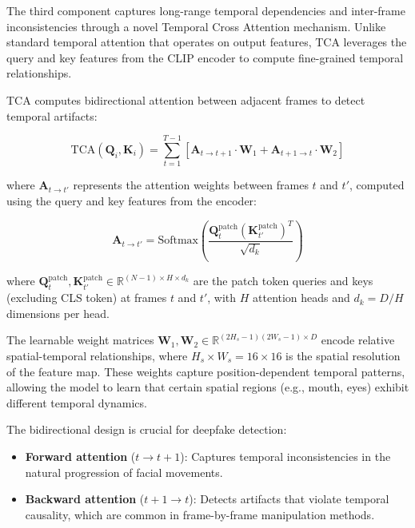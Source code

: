The third component captures long-range temporal dependencies and inter-frame inconsistencies through a novel Temporal Cross Attention mechanism. Unlike standard temporal attention that operates on output features, TCA leverages the query and key features from the CLIP encoder to compute fine-grained temporal relationships.

TCA computes bidirectional attention between adjacent frames to detect temporal artifacts:

\begin{equation}
\text{TCA}(\mathbf{Q}_i, \mathbf{K}_i) = \sum_{t=1}^{T-1} \left[ \mathbf{A}_{t \rightarrow t+1} \cdot \mathbf{W}_1 + \mathbf{A}_{t+1 \rightarrow t} \cdot \mathbf{W}_2 \right]
\end{equation}

where $\mathbf{A}_{t \rightarrow t'}$ represents the attention weights between frames $t$ and $t'$, computed using the query and key features from the encoder:

\begin{equation}
\mathbf{A}_{t \rightarrow t'} = \text{Softmax}\left(\frac{\mathbf{Q}_t^{\text{patch}} (\mathbf{K}_{t'}^{\text{patch}})^T}{\sqrt{d_k}}\right)
\end{equation}

where $\mathbf{Q}_t^{\text{patch}}, \mathbf{K}_{t'}^{\text{patch}} \in \mathbb{R}^{(N-1) \times H \times d_k}$ are the patch token queries and keys (excluding CLS token) at frames $t$ and $t'$, with $H$ attention heads and $d_k = D/H$ dimensions per head.

The learnable weight matrices $\mathbf{W}_1, \mathbf{W}_2 \in \mathbb{R}^{(2H_s-1)(2W_s-1) \times D}$ encode relative spatial-temporal relationships, where $H_s \times W_s = 16 \times 16$ is the spatial resolution of the feature map. These weights capture position-dependent temporal patterns, allowing the model to learn that certain spatial regions (e.g., mouth, eyes) exhibit different temporal dynamics.

The bidirectional design is crucial for deepfake detection:
\begin{itemize}
\item \textbf{Forward attention} ($t \rightarrow t+1$): Captures temporal inconsistencies in the natural progression of facial movements.
\item \textbf{Backward attention} ($t+1 \rightarrow t$): Detects artifacts that violate temporal causality, which are common in frame-by-frame manipulation methods.
\end{itemize}

